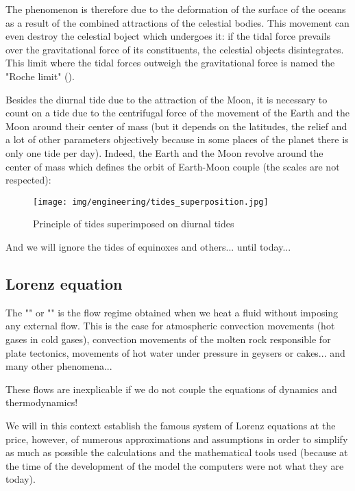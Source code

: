 	\begin{tcolorbox}[title=Remark,colframe=black,arc=10pt]
	The phenomenon is therefore due to the deformation of the surface of the oceans as a result of the combined attractions of the celestial bodies. This movement can even destroy the celestial boject which undergoes it: if the tidal force prevails over the gravitational force of its constituents, the celestial objects disintegrates. This limit where the tidal forces outweigh the gravitational force is named the "Roche limit" ().
	\end{tcolorbox}
	Besides the diurnal tide due to the attraction of the Moon, it is necessary to count on a tide due to the centrifugal force of the movement of the Earth and the Moon around their center of mass (but it depends on the latitudes, the relief and a lot of other parameters objectively because in some places of the planet there is only one tide per day). Indeed, the Earth and the Moon revolve around the center of mass which defines the orbit of Earth-Moon couple (the scales are not respected):
	\begin{figure}[H]
		\centering
		\texttt{[image: img/engineering/tides\_superposition.jpg]}
		\caption{Principle of tides superimposed on diurnal tides}
	\end{figure}
	And we will ignore the tides of equinoxes and others... until today...
	
	\pagebreak
	\subsection{Lorenz equation}
	The "" or "" is the flow regime obtained when we heat a fluid without imposing any external flow. This is the case for atmospheric convection movements (hot gases in cold gases), convection movements of the molten rock responsible for plate tectonics, movements of hot water under pressure in geysers or cakes... and many other phenomena...

	These flows are inexplicable if we do not couple the equations of dynamics and thermodynamics!

	We will in this context establish the famous system of Lorenz equations at the price, however, of numerous approximations and assumptions in order to simplify as much as possible the calculations and the mathematical tools used (because at the time of the development of the model the computers were not what they are today).

